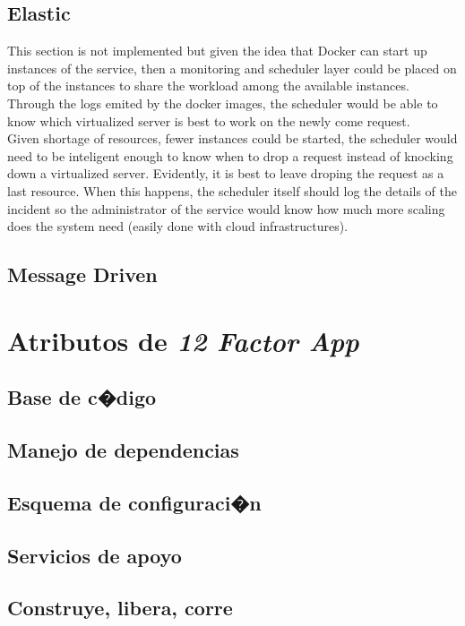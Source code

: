 \documentclass[10pt]{article}
\begin{document}
 	
 \subsection{Elastic}
 
This section is not implemented but given the idea that Docker can start up instances of the service, then a monitoring and scheduler layer could be placed on top of the instances to share the workload among the available instances. Through the logs emited by the docker images, the scheduler would be able to know which virtualized server is best to work on the newly come request.\\

Given shortage of resources, fewer instances could be started, the scheduler would need to be inteligent enough to know when to drop a request instead of knocking down a virtualized server. Evidently, it is best to leave droping the request as a last resource. When this happens, the scheduler itself should log the details of the incident so the administrator of the service would know how much more scaling does the system need (easily done with cloud infrastructures).
 
 \subsection{Message Driven}
 
\section{Atributos de {\em 12 Factor App}}
 \subsection{Base de c�digo}
 \subsection{Manejo de dependencias}
 \subsection{Esquema de configuraci�n}
 \subsection{Servicios de apoyo}
 \subsection{Construye, libera, corre}
\end{document}
